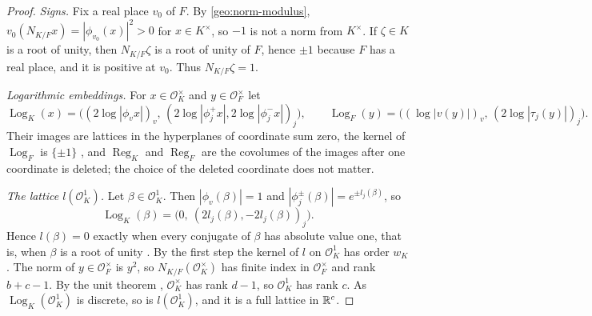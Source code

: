 \begin{proof}
\emph{Signs.} Fix a real place $v_0$ of $F$. By
\eqref{geo:norm-modulus}, $v_0(N_{K/F}x)=|\phi_{v_0}(x)|^2>0$ for
$x\in K^\times$, so $-1$ is not a norm from $K^\times$. If $\zeta\in K$
is a root of unity, then $N_{K/F}\zeta$ is a root of unity of $F$,
hence $\pm1$ because $F$ has a real place, and it is positive at $v_0$.
Thus $N_{K/F}\zeta=1$.

\emph{Logarithmic embeddings.} For $x\in\mathcal O_K^\times$ and
$y\in\mathcal O_F^\times$ let
\[
 \operatorname{Log}_K(x)=\bigl((2\log|\phi_vx|)_v,\,(2\log|\phi_j^+x|,
 2\log|\phi_j^-x|)_j\bigr),\qquad
 \operatorname{Log}_F(y)=\bigl((\log|v(y)|)_v,\,(2\log|\tau_j(y)|)_j\bigr).
\]
Their images are lattices in the hyperplanes of coordinate sum zero,
the kernel of $\operatorname{Log}_F$ is $\{\pm1\}$
\cite[Proposition~5.8]{MilneANT}, and $\operatorname{Reg}_K$ and
$\operatorname{Reg}_F$ are the covolumes of the images after one
coordinate is deleted; the choice of the deleted coordinate does not
matter.

\emph{The lattice $l(\mathcal O_K^1)$.} Let $\beta\in\mathcal O_K^1$. Then
$|\phi_v(\beta)|=1$ and $|\phi_j^\pm(\beta)|=e^{\pm l_j(\beta)}$, so
\[
 \operatorname{Log}_K(\beta)=\bigl(0,\ (2l_j(\beta),-2l_j(\beta))_j\bigr).
\]
Hence $l(\beta)=0$ exactly when every conjugate of $\beta$ has absolute
value one, that is, when $\beta$ is a root of unity
\cite[Corollary~5.6]{MilneANT}. By the first step the kernel of $l$ on
$\mathcal O_K^1$ has order $w_K$. The norm of $y\in\mathcal O_F^\times$
is $y^2$, so $N_{K/F}(\mathcal O_K^\times)$ has finite index in
$\mathcal O_F^\times$ and rank $b+c-1$. By the unit theorem
\cite[Theorem~5.1]{MilneANT}, $\mathcal O_K^\times$ has rank $d-1$, so
$\mathcal O_K^1$ has rank $c$. As $\operatorname{Log}_K(\mathcal O_K^1)$
is discrete, so is $l(\mathcal O_K^1)$, and it is a full lattice in
$\mathbb R^c$.


\end{proof}
